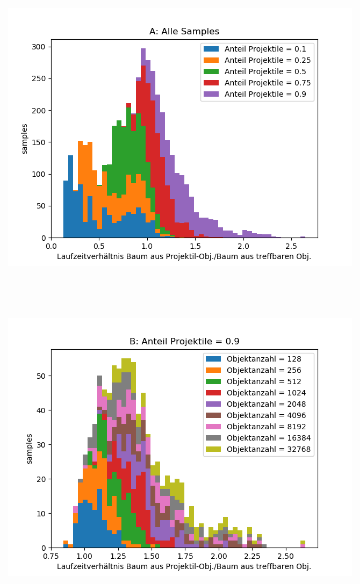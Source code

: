 \begin{figure}
	\begin{subfigure}[t]{0.55\textwidth}
		\centering
		\includegraphics[width=1\textwidth]{./res/boxsortChoice-shotgun-A.png}
		
		\label{fig:boxsortChoice-shotgun-A}
	\end{subfigure}
~
	\begin{subfigure}[t]{0.55\textwidth}
		\centering
		\includegraphics[width=1\textwidth]{./res/boxsortChoice-shotgun-B.png}


\end{subfigure}
\end{figure}
